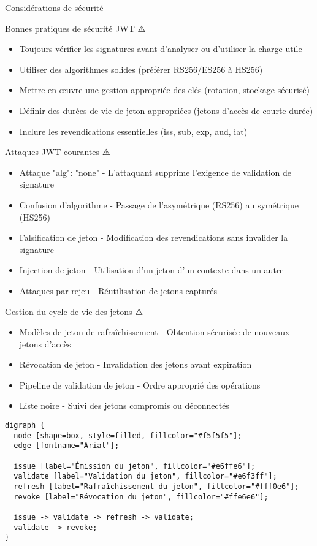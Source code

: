 \documentclass[presentation,aspectratio=169]{beamer}
\begin{document}
\begin{frame}[label={sec:org24b20a0},fragile]{Considérations de sécurité}
 \begin{block}{Bonnes pratiques de sécurité JWT ⚠️}
\begin{itemize}[<+->]
\item \alert{Toujours vérifier les signatures avant d'analyser ou d'utiliser la charge utile}
\item Utiliser des algorithmes solides (préférer RS256/ES256 à HS256)
\item Mettre en œuvre une gestion appropriée des clés (rotation, stockage sécurisé)
\item Définir des durées de vie de jeton appropriées (jetons d'accès de courte durée)
\item Inclure les revendications essentielles (iss, sub, exp, aud, iat)
\end{itemize}
\end{block}
\begin{block}{Attaques JWT courantes ⚠️}
\begin{itemize}[<+->]
\item \alert{Attaque "alg": "none"} - L'attaquant supprime l'exigence de validation de signature
\item \alert{Confusion d'algorithme} - Passage de l'asymétrique (RS256) au symétrique (HS256)
\item \alert{Falsification de jeton} - Modification des revendications sans invalider la signature
\item \alert{Injection de jeton} - Utilisation d'un jeton d'un contexte dans un autre
\item \alert{Attaques par rejeu} - Réutilisation de jetons capturés
\end{itemize}
\end{block}
\begin{block}{Gestion du cycle de vie des jetons ⚠️}
\begin{itemize}[<+->]
\item \alert{Modèles de jeton de rafraîchissement} - Obtention sécurisée de nouveaux jetons d'accès
\item \alert{Révocation de jeton} - Invalidation des jetons avant expiration
\item \alert{Pipeline de validation de jeton} - Ordre approprié des opérations
\item \alert{Liste noire} - Suivi des jetons compromis ou déconnectés
\end{itemize}

\begin{verbatim}
digraph {
  node [shape=box, style=filled, fillcolor="#f5f5f5"];
  edge [fontname="Arial"];

  issue [label="Émission du jeton", fillcolor="#e6ffe6"];
  validate [label="Validation du jeton", fillcolor="#e6f3ff"];
  refresh [label="Rafraîchissement du jeton", fillcolor="#fff0e6"];
  revoke [label="Révocation du jeton", fillcolor="#ffe6e6"];

  issue -> validate -> refresh -> validate;
  validate -> revoke;
}
\end{verbatim}
\end{block}
\end{frame}
\end{document}
